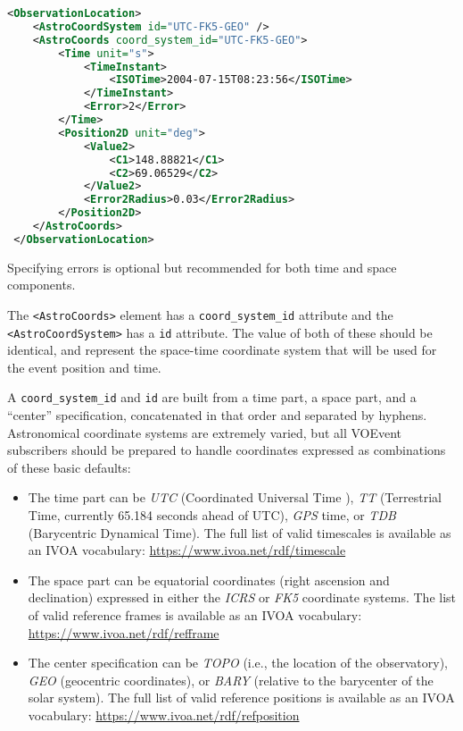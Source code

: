\documentclass[11pt,a4paper]{ivoa}
\begin{document}
\begin{lstlisting}[language=XML]
<ObservationLocation>
    <AstroCoordSystem id="UTC-FK5-GEO" />
    <AstroCoords coord_system_id="UTC-FK5-GEO">
        <Time unit="s">
            <TimeInstant>
                <ISOTime>2004-07-15T08:23:56</ISOTime>
            </TimeInstant>
            <Error>2</Error>
        </Time>
        <Position2D unit="deg">
            <Value2>
                <C1>148.88821</C1>
                <C2>69.06529</C2>
            </Value2>
            <Error2Radius>0.03</Error2Radius>
        </Position2D>
    </AstroCoords>
 </ObservationLocation>
\end{lstlisting}

Specifying errors is optional but recommended for both time and space
components.

The {\tt <AstroCoords>} element has a {\tt coord\_system\_id} attribute and the
{\tt <AstroCoordSystem>} has a {\tt id} attribute. The value of both of these
should be identical, and represent the space-time coordinate system that will be
used for the event position and time.

A {\tt coord\_system\_id} and {\tt id} are built from a time part, a space part,
and a ``center'' specification, concatenated in that order and separated by
hyphens. Astronomical coordinate systems are extremely varied, but all VOEvent
subscribers should be prepared to handle coordinates expressed as combinations
of these basic defaults:
\begin{itemize}
\item The time part can be \emph{UTC} (Coordinated Universal Time
\citep{bib26}), \emph{TT} (Terrestrial Time, currently 65.184 seconds ahead of
UTC), \emph{GPS} time, or \emph{TDB} (Barycentric Dynamical Time). The full list
of valid timescales is available as an IVOA vocabulary:
\url{https://www.ivoa.net/rdf/timescale}
\item The space part can be equatorial coordinates (right ascension and
declination) expressed in either the \emph{ICRS} or \emph{FK5} coordinate
systems. The list of valid reference frames is available as an IVOA vocabulary:
\url{https://www.ivoa.net/rdf/refframe}
\item The center specification can be \emph{TOPO} (i.e., the location of the
observatory), \emph{GEO} (geocentric coordinates), or \emph{BARY} (relative to
the barycenter of the solar system). The full list of valid reference positions
is available as an IVOA vocabulary: \url{https://www.ivoa.net/rdf/refposition}
\end{itemize}
\end{document}
